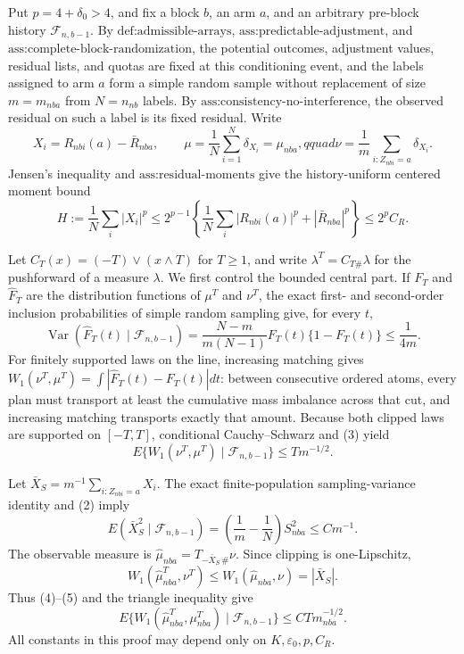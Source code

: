 Put \(p=4+\delta_0>4\), and fix a block \(b\), an arm \(a\), and an arbitrary pre-block history \(\mathcal F_{n,b-1}\). By \(\text{def:admissible-arrays}\), \(\text{ass:predictable-adjustment}\), and \(\text{ass:complete-block-randomization}\), the potential outcomes, adjustment values, residual lists, and quotas are fixed at this conditioning event, and the labels assigned to arm \(a\) form a simple random sample without replacement of size \(m=m_{nba}\) from \(N=n_{nb}\) labels. By \(\text{ass:consistency-no-interference}\), the observed residual on such a label is its fixed residual. Write
\[
X_i=R_{nbi}(a)-\bar R_{nba},\qquad
\mu=\frac1N\sum_{i=1}^N\delta_{X_i}=\mu_{nba},qquad
\nu=\frac1m\sum_{i:Z_{nbi}=a}\delta_{X_i}.
\tag{1}
\]
Jensen's inequality and \(\text{ass:residual-moments}\) give the history-uniform centered moment bound
\[
H:=\frac1N\sum_i|X_i|^p
\le2^{p-1}\left\{\frac1N\sum_i|R_{nbi}(a)|^p+|\bar R_{nba}|^p\right\}
\le2^pC_R.
\tag{2}
\]

Let \(C_T(x)=(-T)\vee(x\wedge T)\) for \(T\ge1\), and write \(\lambda^T=C_{T\#}\lambda\) for the pushforward of a measure \(\lambda\). We first control the bounded central part. If \(F_T\) and \(\widehat F_T\) are the distribution functions of \(\mu^T\) and \(\nu^T\), the exact first- and second-order inclusion probabilities of simple random sampling give, for every \(t\),
\[
\operatorname{Var}(\widehat F_T(t)\mid\mathcal F_{n,b-1})
=\frac{N-m}{m(N-1)}F_T(t)\{1-F_T(t)\}\le\frac1{4m}.
\tag{3}
\]
For finitely supported laws on the line, increasing matching gives
\(W_1(\nu^T,\mu^T)=\int|\widehat F_T(t)-F_T(t)|dt\): between consecutive ordered atoms, every plan must transport at least the cumulative mass imbalance across that cut, and increasing matching transports exactly that amount. Because both clipped laws are supported on \([-T,T]\), conditional Cauchy--Schwarz and (3) yield
\[
E\{W_1(\nu^T,\mu^T)\mid\mathcal F_{n,b-1}\}\le Tm^{-1/2}.
\tag{4}
\]

Let \(\bar X_S=m^{-1}\sum_{i:Z_{nbi}=a}X_i\). The exact finite-population sampling-variance identity and (2) imply
\[
E(\bar X_S^2\mid\mathcal F_{n,b-1})
=\left(\frac1m-\frac1N\right)S_{nba}^2\le C m^{-1}.
\tag{5}
\]
The observable measure is \(\widehat\mu_{nba}=T_{-\bar X_S\,\#}\nu\). Since clipping is one-Lipschitz,
\[
W_1(\widehat\mu_{nba}^T,\nu^T)\le W_1(\widehat\mu_{nba},\nu)=|\bar X_S|.
\]
Thus (4)--(5) and the triangle inequality give
\[
E\{W_1(\widehat\mu_{nba}^T,\mu_{nba}^T)\mid\mathcal F_{n,b-1}\}
\le CTm_{nba}^{-1/2}.
\tag{6}
\]
All constants in this proof may depend only on \(K,\varepsilon_0,p,C_R\).

